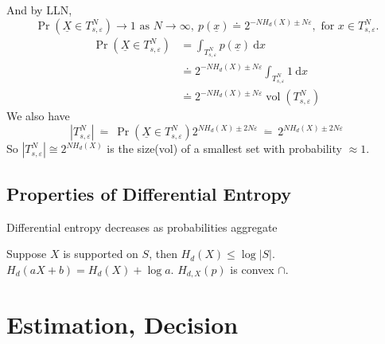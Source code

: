 \documentclass{report}
\newcommand{\idf}{\ \mathrm{d}}
\newcommand{\ddoteq}{\ \ddot{=}\ }
\theoremstyle{definition}
\theoremstyle{remark}
\numberwithin{equation}{section}
\begin{document}
And by LLN, \[
\Pr(\underline{X} \in T_{s,\varepsilon}^N) \to 1 \text{ as } N \to \infty,\ p(\underline{x}) \doteq 2^{-NH_d(X)\pm N\varepsilon}, \text{ for } x \in T_{s, \varepsilon}^N.
\]
\begin{align*}
  \Pr\left(\underline{X} \in T_{s,\varepsilon}^N\right) & = \int_{T_{s, \varepsilon}^N}p(\underline{x}) \idf x \\
  & \doteq 2^{-NH_d(X)\pm N\varepsilon} \int_{T_{s, \varepsilon}^N} 1 \idf x \\
  & \doteq 2^{-NH_d(X)\pm N\varepsilon} \operatorname{vol}(T_{s, \varepsilon}^N)
\end{align*}
We also have \[|T_{s,\varepsilon}^N| \ddoteq \Pr(\underline{X} \in T_{s, \varepsilon}^N)2^{NH_d(X)\pm2N\varepsilon}\ddoteq 2^{NH_d(X)\pm2N\varepsilon}\]
So \(|T_{s,\varepsilon}^N| \cong 2^{NH_d(X)}\) is the size(vol) of a smallest set with probability $\approx 1$.

\section{Properties of Differential Entropy}

Differential entropy decreases as probabilities aggregate

Suppose $X$ is supported on $S$, then $H_d(X) \leq \log |S|$.
$H_{d}(aX+b) = H_d(X) + \log a$.
$H_{d, X}(p)$ is convex $\cap$.

\chapter{Estimation, Decision}
\end{document}
